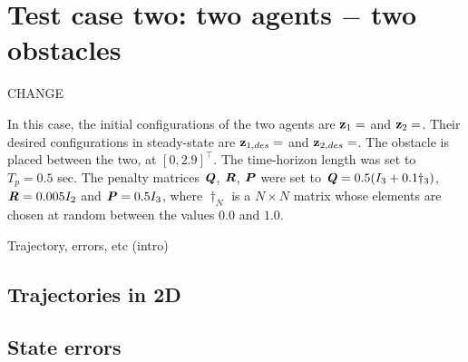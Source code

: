 \section{Test case two: two agents $-$ two obstacles}

CHANGE

In this case, the initial configurations of the two agents are
$\bm{\mathbf{z}}_1 = $ and
$\bm{\mathbf{z}}_2 = $.
Their desired configurations in steady-state are
$\bm{\mathbf{z}}_{1,des} = $ and
$\bm{\mathbf{z}}_{2,des} = $.
The obstacle is placed between the two, at $[0, 2.9]^{\top}$. The time-horizon
length was set to $T_p = 0.5$ sec. The penalty matrices $\bm{\mathit{Q}}$, $\bm{\mathit{R}}$,
$\bm{\mathit{P}}$ were set to $\bm{\mathit{Q}} = 0.5 (I_3 + 0.1 \dagger_3)$,
$\bm{\mathit{R}} = 0.005 I_2$ and $\bm{\mathit{P}} = 0.5 I_3$, where $\dagger_N$ is a
$N \times N$ matrix whose elements are chosen at random between the values $0.0$
and $1.0$.

Trajectory, errors, etc (intro)


\subsection{Trajectories in 2D}

\begin{figure}[H]
  
  \caption{}
  \label{}
\end{figure}


\subsection{State errors}

\noindent{}


